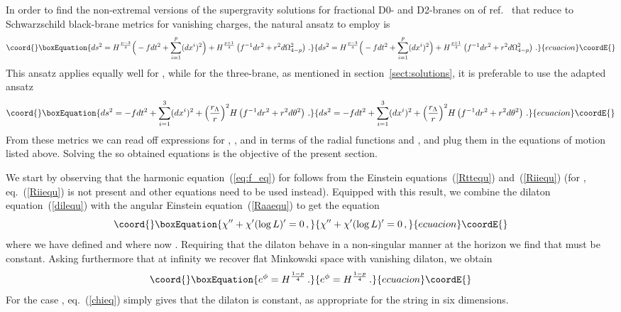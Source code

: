 \documentclass[a4paper,11pt]{article}
\providecommand{\eqref}[1]{(\ref{#1})}
\providecommand{\ZZ}{\mathbb{Z}}  \providecommand{\Zint}{\mathbb{Z}}
\begin{document}
In order to find the non-extremal versions of the supergravity
solutions for fractional D0- and D2-branes on \myHighlight{$T^4\!/\ZZ_2$}\coordHE{} of
ref.~\cite{Frau:2000gk} that reduce to Schwarz\-schild black-brane
metrics for vanishing charges, the natural ansatz to employ is
%
\begin{equation}\coord{}\boxEquation{
\label{our_ansatz}
ds^2 = H^{\frac{p-3}{4}} \Big( - f dt^2 + \sum_{i=1}^p (dx^i)^2 \Big)
    + H^{\frac{p+1}{4}} \left( f^{-1}dr^2 + r^2 d\Omega_{4-p}^2
    \right)\,.
}{
ds^2 = H^{\frac{p-3}{4}} \Big( - f dt^2 + \sum_{i=1}^p (dx^i)^2 \Big)
    + H^{\frac{p+1}{4}} \left( f^{-1}dr^2 + r^2 d\Omega_{4-p}^2
    \right)\,.
}{ecuacion}\coordE{}\end{equation}
%
This ansatz applies equally well for \coordHE{}, while for the three-brane,
as mentioned in section~\ref{sect:solutions}, it is preferable to use
the adapted ansatz
\begin{equation}\coord{}\boxEquation{
\label{our_ansatz3}
ds^2 = - f dt^2 + \sum_{i=1}^3 (dx^i)^2 +
 \Big(\frac{r_\Lambda}{r}\Big)^2 H \left( f^{-1}dr^2 + r^2 d\theta^2
 \right) \,.
}{
ds^2 = - f dt^2 + \sum_{i=1}^3 (dx^i)^2 +
 \Big(\frac{r_\Lambda}{r}\Big)^2 H \left( f^{-1}dr^2 + r^2 d\theta^2
 \right) \,.
}{ecuacion}\coordE{}\end{equation}
%
From these metrics we can read off expressions for \coordHE{}, \coordHE{}, \coordHE{} and
\coordHE{} in terms of the radial functions \coordHE{} and \coordHE{}, and plug them in the
equations of motion listed above. Solving the so obtained equations is
the objective of the present section.

We start by observing that the harmonic equation~\eqref{eq:f_eq} for
\coordHE{} follows from the Einstein equations~\eqref{Rttequ}
and~\eqref{Riiequ} (for \coordHE{}, eq.~\eqref{Riiequ} is not present and
other equations need to be used instead). Equipped with this result,
we combine the dilaton equation~\eqref{dilequ} with the angular
Einstein equation~\eqref{Raaequ} to get the equation
%
\begin{equation}\coord{}\boxEquation{
\label{chieq}
\chi'' + \chi' (\log L)' = 0 \,,
}{
\chi'' + \chi' (\log L)' = 0 \,,
}{ecuacion}\coordE{}\end{equation}
%
where we have defined \coordHE{} and where now
\coordHE{}. Requiring that the dilaton behave in a non-singular
manner at the horizon we find that \myHighlight{$\chi$}\coordHE{} must be constant. Asking
furthermore that at infinity we recover flat Minkowski space with
vanishing dilaton, we obtain
%
\begin{equation}\coord{}\boxEquation{
\label{phiHrelp}
e^\phi = H^{\frac{1-p}{4}} \,.
}{
e^\phi = H^{\frac{1-p}{4}} \,.
}{ecuacion}\coordE{}\end{equation}
%
For the case \coordHE{}, eq.~\eqref{chieq} simply gives that the dilaton is
constant, as appropriate for the string in six dimensions.
\end{document}
